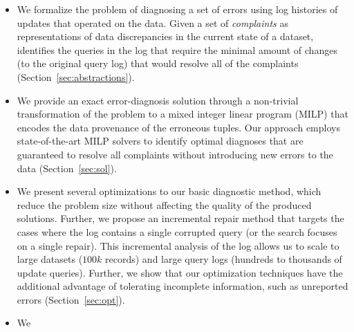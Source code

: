 \begin{itemize}[leftmargin=*, topsep=0mm, itemsep=0mm]      
    \item We formalize the problem of diagnosing a set of errors using log
    histories of updates that operated on the data. Given a set of 
    \emph{complaints} as representations of data discrepancies in the current
    state of a dataset, \sys identifies the queries in the log that require the  minimal
    amount of changes (to the original query log) 
    that would resolve all of the complaints (Section~\ref{sec:abstractions}).
      
    \item We provide an exact error-diagnosis solution through a non-trivial
    transformation of the problem to a mixed integer linear program (MILP) that
    encodes the data provenance of the erroneous tuples. Our approach employs state-of-the-art MILP solvers to identify
    optimal diagnoses that are guaranteed to resolve all complaints without introducing new errors to the data
    (Section~\ref{sec:sol}).
    
    \item We present several optimizations to our basic diagnostic
    method, which reduce the problem size without affecting the
    quality of the produced solutions. Further, we propose an
    incremental repair method that targets the cases where the log
    contains a single corrupted query (or the search focuses on a
    single repair). This incremental analysis of the log allows us to
    scale to large datasets ($100k$ records) and large query logs (hundreds to thousands of update queries). Further, we
    show that our optimization techniques have the additional
    advantage of tolerating incomplete information, such as unreported
    errors (Section~\ref{sec:opt}).

    
    
    \item We 
\end{itemize}

